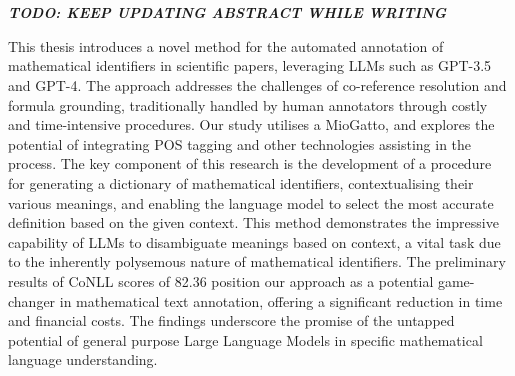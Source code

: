 \chapter{\abstractname}

\textbf{\textit{TODO: KEEP UPDATING ABSTRACT WHILE WRITING}}


This thesis introduces a novel method for the automated annotation of mathematical identifiers in scientific papers, leveraging \ac{LLMs} such as GPT-3.5 and GPT-4. The approach addresses the challenges of co-reference resolution and formula grounding, traditionally handled by human annotators through costly and time-intensive procedures. Our study utilises a \ac{MioGatto}, and explores the potential of integrating \ac{POS} tagging and other technologies assisting in the process.
The key component of this research is the development of a procedure for generating a dictionary of mathematical identifiers, contextualising their various meanings, and enabling the language model to select the most accurate definition based on the given context. This method demonstrates the impressive capability of LLMs to disambiguate meanings based on context, a vital task due to the inherently polysemous nature of mathematical identifiers.
The preliminary results of \ac{CoNLL} scores of 82.36 position our approach as a potential game-changer in mathematical text annotation, offering a significant reduction in time and financial costs.
The findings underscore the promise of the untapped potential of general purpose Large Language Models in specific mathematical language understanding.
